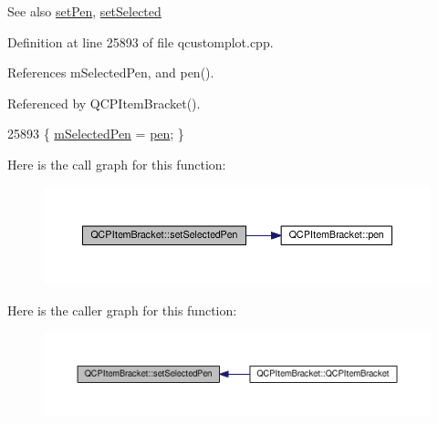 \begin{DoxySeeAlso}{See also}
\hyperlink{class_q_c_p_item_bracket_ab13001d9cc5d8f9e56ea15bdda682acb}{set\+Pen}, \hyperlink{class_q_c_p_abstract_item_a203de94ad586cc44d16c9565f49d3378}{set\+Selected} 
\end{DoxySeeAlso}


Definition at line 25893 of file qcustomplot.\+cpp.



References m\+Selected\+Pen, and pen().



Referenced by Q\+C\+P\+Item\+Bracket().


\begin{DoxyCode}
25893 \{ \hyperlink{class_q_c_p_item_bracket_adcfb53602d1802d00e2de4fd6df6b291}{mSelectedPen} = \hyperlink{class_q_c_p_item_bracket_a8963ff4a232b649c83d2461fd3c30d39}{pen}; \}
\end{DoxyCode}


Here is the call graph for this function\+:\nopagebreak
\begin{figure}[H]
\begin{center}
\leavevmode
\includegraphics[width=350pt]{class_q_c_p_item_bracket_a349785c31122778a520c64891fa204c5_cgraph}
\end{center}
\end{figure}




Here is the caller graph for this function\+:\nopagebreak
\begin{figure}[H]
\begin{center}
\leavevmode
\includegraphics[width=350pt]{class_q_c_p_item_bracket_a349785c31122778a520c64891fa204c5_icgraph}
\end{center}
\end{figure}


\hypertarget{class_q_c_p_item_bracket_a612dffa2373422eef8754d690add3703}{}
